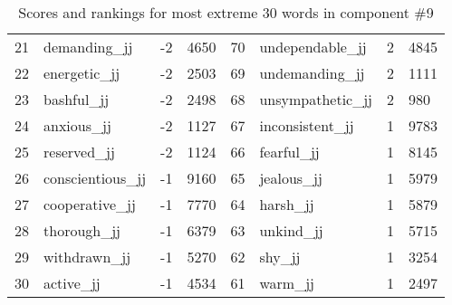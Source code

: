 \begin{table}[tbp]
\begin{tabular}{| rlr@{.}l | rlr@{.}l |}
    21 & demanding\_jj & -2 & 4650    &    70 & undependable\_jj & 2 & 4845 \\
    22 & energetic\_jj & -2 & 2503    &    69 & undemanding\_jj & 2 & 1111 \\
    23 & bashful\_jj & -2 & 2498    &    68 & unsympathetic\_jj & 2 & 980 \\
    24 & anxious\_jj & -2 & 1127    &    67 & inconsistent\_jj & 1 & 9783 \\
    25 & reserved\_jj & -2 & 1124    &    66 & fearful\_jj & 1 & 8145 \\
    26 & conscientious\_jj & -1 & 9160    &    65 & jealous\_jj & 1 & 5979 \\
    27 & cooperative\_jj & -1 & 7770    &    64 & harsh\_jj & 1 & 5879 \\
    28 & thorough\_jj & -1 & 6379    &    63 & unkind\_jj & 1 & 5715 \\
    29 & withdrawn\_jj & -1 & 5270    &    62 & shy\_jj & 1 & 3254 \\
    30 & active\_jj & -1 & 4534    &    61 & warm\_jj & 1 & 2497 \\
    \hline
    \end{tabular}
    \caption{Scores and rankings for most extreme 30 words in component \#9} 
\end{table}
\clearpage
